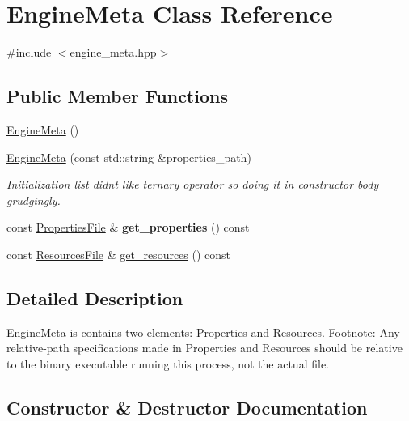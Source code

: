 \hypertarget{class_engine_meta}{}\section{Engine\+Meta Class Reference}
\label{class_engine_meta}


{\ttfamily \#include $<$engine\+\_\+meta.\+hpp$>$}

\subsection*{Public Member Functions}
\begin{DoxyCompactItemize}
\item 
\mbox{\hyperlink{class_engine_meta_acd384c252773279afc79cfa535d6487c}{Engine\+Meta}} ()
\item 
\mbox{\hyperlink{class_engine_meta_aead57aabdb172dd359bd34dc99c1c37e}{Engine\+Meta}} (const std\+::string \&properties\+\_\+path)
\begin{DoxyCompactList}\small\item\em Initialization list didn\textquotesingle{}t like ternary operator so doing it in constructor body grudgingly. \end{DoxyCompactList}\item 
\mbox{\label{class_engine_meta_ac1cf6856bb63a162c2284e842eaa6d9e}} 
const \mbox{\hyperlink{class_properties_file}{Properties\+File}} \& {\bfseries get\+\_\+properties} () const
\item 
const \mbox{\hyperlink{class_resources_file}{Resources\+File}} \& \mbox{\hyperlink{class_engine_meta_a3834c2a1d2fb9a957ac856dd50f33cd4}{get\+\_\+resources}} () const
\end{DoxyCompactItemize}


\subsection{Detailed Description}
\mbox{\hyperlink{class_engine_meta}{Engine\+Meta}} is contains two elements\+: Properties and Resources. Footnote\+: Any relative-\/path specifications made in Properties and Resources should be relative to the binary executable running this process, not the actual file. 

\subsection{Constructor \& Destructor Documentation}
\mbox{\label{class_engine_meta_acd384c252773279afc79cfa535d6487c}} 
